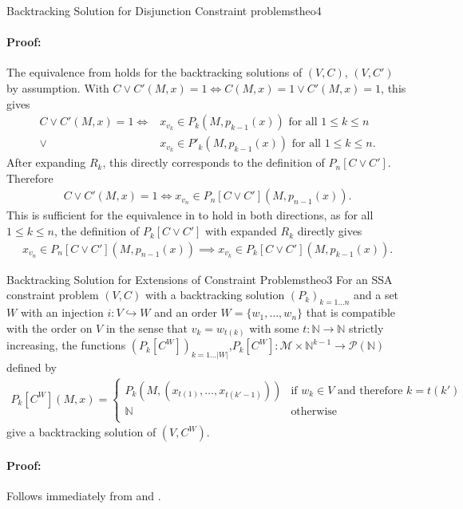 \begin{theorem}{Backtracking Solution for Disjunction Constraint problems}{theo4}
    \paragraph*{Proof:} The equivalence from 
                        holds for the backtracking solutions
                        of $(V,C)$, $(V,C')$ by assumption.
                        With $C\mathrel\lor C'(M,x)=1\iff C(M,x)=1\mathrel\lor C'(M,x)=1$,
                        this gives
    \begin{align*}
        C\mathrel\lor C'(M,x)=1\iff{}&x_{v_k}\in P_k(M,p_{k-1}(x))\text{ for all }1\leq k\leq n\\
                              \mathrel\lor{}&x_{v_k}\in P'_k(M,p_{k-1}(x))\text{ for all }1\leq k\leq n.
    \end{align*}
    After expanding $R_k$, this directly corresponds to the definition of
    $P_n[C\mathrel\lor C']$.
    Therefore
    \begin{align*}
        C\mathrel\lor C'(M,x)=1\iff{}x_{v_n}\in P_n[C\mathrel\lor C'](M,p_{n-1}(x)).
    \end{align*}
    This is sufficient for the equivalence in  to hold
    in both directions, as for all $1\leq k\leq n$, the definition of
    $P_k[C\mathrel\lor C']$ with expanded $R_k$ directly gives
    \begin{align*}
        x_{v_n}\in P_n[C\mathrel\lor C'](M,p_{n-1}(x))\implies x_{v_k}\in P_k[C\mathrel\lor C'](M,p_{k-1}(x)).
    \end{align*}
\end{theorem}
\begin{theorem}{Backtracking Solution for Extensions of Constraint Problems}{theo3}
    For an SSA constraint problem $(V,C)$ with a backtracking
    solution $(P_k)_{k=1\dots n}$ and a set $W$ with an injection
    $i:V\hookrightarrow W$ and an order $W=\{w_1,\dots,w_n\}$ that is
    compatible with the order on $V$ in the sense that $v_k=w_{t(k)}$ with
    some $t:\mathbb N\rightarrow\mathbb N$ strictly increasing, the functions
    $(P_k[C^W])_{k=1\dots |W|}$,$P_k[C^W]\colon\mathcal M\times\mathbb N^{k-1}\rightarrow\mathcal P(\mathbb N)$
    defined by
    \begin{align*}
        P_k[C^W](M,x)=\left\{
            \begin{array}{ll}
                P_k\left(M,\left(x_{t(1)},\dots,x_{t(k'-1)}\right)\right)&\text{if }w_k\in V\text{ and therefore }k=t(k')\\
                \mathbb N&\text{otherwise}\\
            \end{array}\right.
    \end{align*}
    give a backtracking solution of $(V,C^W)$.
    \tcblower
    \paragraph*{Proof:} Follows immediately from  and .
\end{theorem}
